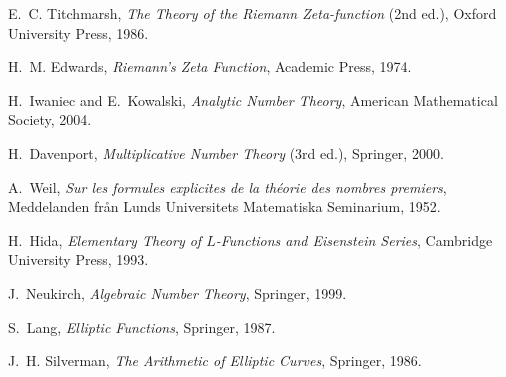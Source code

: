 \documentclass[11pt,a4paper]{article}
\theoremstyle{remark}
\begin{document}
\begin{thebibliography}{9}

E.~C. Titchmarsh, \emph{The Theory of the Riemann Zeta-function} (2nd ed.), Oxford University Press, 1986.

H.~M. Edwards, \emph{Riemann's Zeta Function}, Academic Press, 1974.

H.~Iwaniec and E.~Kowalski, \emph{Analytic Number Theory}, American Mathematical Society, 2004.

H.~Davenport, \emph{Multiplicative Number Theory} (3rd ed.), Springer, 2000.

A.~Weil, \emph{Sur les formules explicites de la th\'eorie des nombres premiers}, Meddelanden fr\aa n Lunds Universitets Matematiska Seminarium, 1952.

H.~Hida, \emph{Elementary Theory of $L$-Functions and Eisenstein Series}, Cambridge University Press, 1993.

J.~Neukirch, \emph{Algebraic Number Theory}, Springer, 1999.

S.~Lang, \emph{Elliptic Functions}, Springer, 1987.

J.~H. Silverman, \emph{The Arithmetic of Elliptic Curves}, Springer, 1986.

\end{thebibliography}
\end{document}
